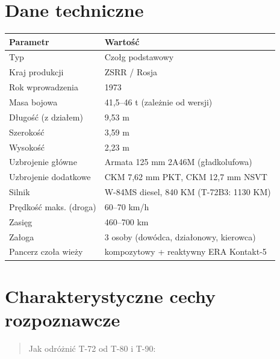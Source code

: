 \documentclass[12pt,openany,oneside]{book}
\begin{document}
\section{Dane techniczne}\label{dane-techniczne}

\begin{longtable}[]{@{}ll@{}}
\toprule\noalign{}
Parametr & Wartość \\
\midrule\noalign{}
\endhead
\bottomrule\noalign{}
\endlastfoot
Typ & Czołg podstawowy \\
Kraj produkcji & ZSRR / Rosja \\
Rok wprowadzenia & 1973 \\
Masa bojowa & 41,5--46 t (zależnie od wersji) \\
Długość (z działem) & 9,53 m \\
Szerokość & 3,59 m \\
Wysokość & 2,23 m \\
Uzbrojenie główne & Armata 125 mm 2A46M (gładkolufowa) \\
Uzbrojenie dodatkowe & CKM 7,62 mm PKT, CKM 12,7 mm NSVT \\
Silnik & W-84MS diesel, 840 KM (T-72B3: 1130 KM) \\
Prędkość maks. (droga) & 60--70 km/h \\
Zasięg & 460--700 km \\
Załoga & 3 osoby (dowódca, działonowy, kierowca) \\
Pancerz czoła wieży & kompozytowy + reaktywny ERA Kontakt-5 \\
\end{longtable}

\section{Charakterystyczne cechy
rozpoznawcze}\label{charakterystyczne-cechy-rozpoznawcze}

\begin{quote}
Jak odróżnić T-72 od T-80 i T-90:
\end{quote}
\end{document}
